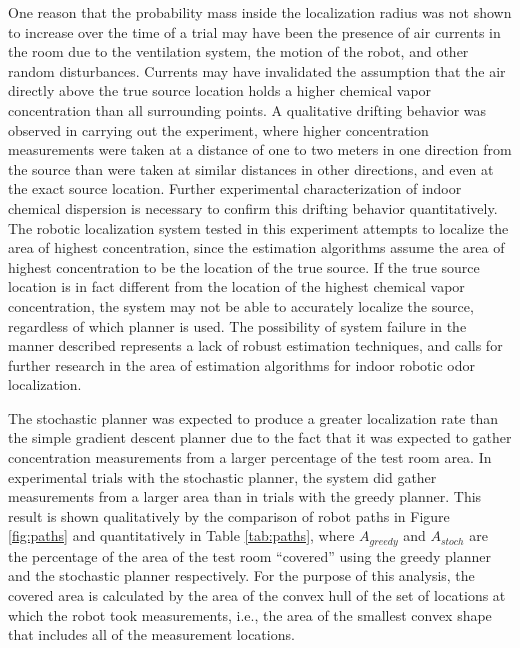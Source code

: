 \documentclass[submit, 12pt]{aiaa-pretty-modified}
\begin{document}
One reason that the probability mass inside the localization
radius was not shown to increase over the time of a trial may have been
the presence of air currents in the room due to the ventilation
system, the motion of the robot, and other random disturbances. Currents may have invalidated the
assumption that the air directly above the true source location
holds a higher chemical vapor concentration than all surrounding
points.  A qualitative drifting behavior was observed in carrying out
the experiment, where higher concentration measurements were taken
at a distance of one to two meters in one direction from the source than were
taken at similar distances in other directions, and even at the exact
source location.  Further experimental characterization of indoor
chemical dispersion is necessary to confirm this drifting
behavior quantitatively.  The robotic localization system tested in
this experiment attempts to localize the area of highest
concentration, since the estimation algorithms assume the area of highest
concentration to be the location of the true source.  If the true
source location is in fact different from the location of the
highest chemical vapor concentration, the system may not be able to accurately
localize the source, regardless of which planner is used.  The
possibility of system failure in the manner described represents a lack of robust estimation techniques, and
calls for further research in the area of estimation algorithms for
indoor robotic odor localization.

The stochastic planner was expected to produce a greater localization
rate than the simple gradient descent planner due to the fact that it
was expected to gather concentration measurements from a larger
percentage of the test room area.  In experimental trials with the
stochastic planner, the system did gather measurements from a larger
area than in trials with the greedy planner.  This result is shown
qualitatively by the comparison of robot paths in Figure \ref{fig:paths} and
quantitatively in Table \ref{tab:paths}, where $A_{greedy}$ and
$A_{stoch}$ are the percentage of the area of the test room ``covered''
using the greedy planner and the stochastic planner respectively.  For
the purpose of this analysis, the covered area is calculated by the
area of the convex hull
of the set of locations at which the robot took measurements, i.e., the area of
the smallest convex shape that includes all of the measurement locations.
\end{document}
